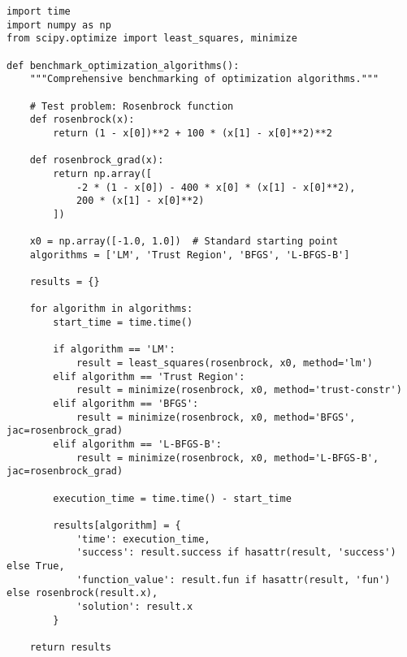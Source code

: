 \documentclass[11pt,a4paper]{article}
\begin{document}
\begin{lstlisting}[caption=Performance Benchmarking Implementation]
import time
import numpy as np
from scipy.optimize import least_squares, minimize

def benchmark_optimization_algorithms():
    """Comprehensive benchmarking of optimization algorithms."""

    # Test problem: Rosenbrock function
    def rosenbrock(x):
        return (1 - x[0])**2 + 100 * (x[1] - x[0]**2)**2

    def rosenbrock_grad(x):
        return np.array([
            -2 * (1 - x[0]) - 400 * x[0] * (x[1] - x[0]**2),
            200 * (x[1] - x[0]**2)
        ])

    x0 = np.array([-1.0, 1.0])  # Standard starting point
    algorithms = ['LM', 'Trust Region', 'BFGS', 'L-BFGS-B']

    results = {}

    for algorithm in algorithms:
        start_time = time.time()

        if algorithm == 'LM':
            result = least_squares(rosenbrock, x0, method='lm')
        elif algorithm == 'Trust Region':
            result = minimize(rosenbrock, x0, method='trust-constr')
        elif algorithm == 'BFGS':
            result = minimize(rosenbrock, x0, method='BFGS', jac=rosenbrock_grad)
        elif algorithm == 'L-BFGS-B':
            result = minimize(rosenbrock, x0, method='L-BFGS-B', jac=rosenbrock_grad)

        execution_time = time.time() - start_time

        results[algorithm] = {
            'time': execution_time,
            'success': result.success if hasattr(result, 'success') else True,
            'function_value': result.fun if hasattr(result, 'fun') else rosenbrock(result.x),
            'solution': result.x
        }

    return results
\end{lstlisting}
\end{document}
